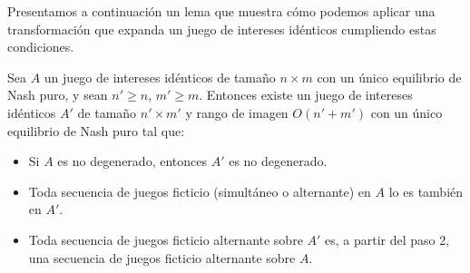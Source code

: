 Presentamos a continuación un lema que muestra cómo podemos aplicar una transformación que expanda un juego de intereses idénticos cumpliendo estas condiciones.

\begin{lemma}\label{lema:preservacion}
    Sea $A$ un juego de intereses idénticos de tamaño $n\times m$ con un único equilibrio de Nash puro, y sean $n'\geq n$, $m'\geq m$. Entonces existe un juego de intereses idénticos $A'$ de tamaño $n'\times m'$ y rango de imagen $O(n'+m')$ con un único equilibrio de Nash puro tal que:
    \begin{itemize}
        \item Si $A$ es no degenerado, entonces $A'$ es no degenerado.
        \item Toda secuencia de juegos ficticio (simultáneo o alternante) en $A$ lo es también en $A'$.
        \item Toda secuencia de juegos ficticio alternante sobre $A'$ es, a partir del paso 2, una secuencia de juegos ficticio alternante sobre $A$.
    \end{itemize}
    
\end{lemma}
